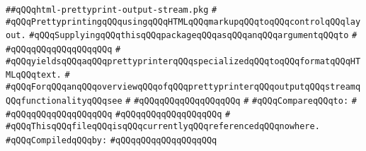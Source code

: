 \label{src/lib/prettyprint/big/src/out/html-prettyprint-output-stream.pkg}
\verb|##qQQqhtml-prettyprint-output-stream.pkg|\newline
\verb|#|\newline
\verb|#qQQqPrettyprintingqQQqusingqQQqHTMLqQQqmarkupqQQqtoqQQqcontrolqQQqlayout.|\newline
\verb|#qQQqSupplyingqQQqthisqQQqpackageqQQqasqQQqanqQQqargumentqQQqto|\newline
\verb|#|\newline
\verb|#qQQqqQQqqQQqqQQqqQQq|\newline
\verb|#|\newline
\verb|#qQQqyieldsqQQqaqQQqprettyprinterqQQqspecializedqQQqtoqQQqformatqQQqHTMLqQQqtext.|\newline
\verb|#|\newline
\verb|#qQQqForqQQqanqQQqoverviewqQQqofqQQqprettyprinterqQQqoutputqQQqstreamqQQqfunctionalityqQQqsee|\newline
\verb|#|\newline
\verb|#qQQqqQQqqQQqqQQqqQQq|\newline
\verb|#|\newline
\verb|#qQQqCompareqQQqto:|\newline
\verb|#|\newline
\verb|#qQQqqQQqqQQqqQQqqQQq|\newline
\verb|#qQQqqQQqqQQqqQQqqQQq|\newline
\verb|#|\newline
\verb|#qQQqThisqQQqfileqQQqisqQQqcurrentlyqQQqreferencedqQQqnowhere.|\newline
\newline
\verb|#qQQqCompiledqQQqby:|\newline
\verb|#qQQqqQQqqQQqqQQqqQQq|\newline
\newline
